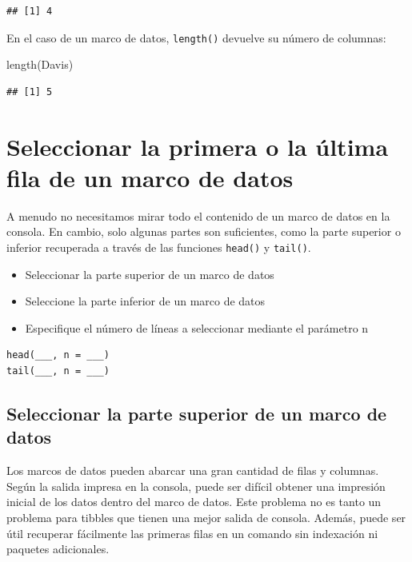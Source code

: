 \documentclass[
]{book}
\newenvironment{Shaded}{\begin{snugshade}}{\end{snugshade}}
\newcommand{\FunctionTok}[1]{\textcolor[rgb]{0.00,0.00,0.00}{#1}}
\newcommand{\NormalTok}[1]{#1}
\providecommand{\tightlist}{%
  \setlength{\itemsep}{0pt}\setlength{\parskip}{0pt}}
\begin{document}
\begin{verbatim}
## [1] 4
\end{verbatim}

En el caso de un marco de datos, \texttt{length()} devuelve su número de columnas:

\begin{Shaded}
\begin{Highlighting}[]
\FunctionTok{length}\NormalTok{(Davis)}
\end{Highlighting}
\end{Shaded}

\begin{verbatim}
## [1] 5
\end{verbatim}

\hypertarget{seleccionar-la-primera-o-la-uxfaltima-fila-de-un-marco-de-datos}{%
\section{Seleccionar la primera o la última fila de un marco de datos}\label{seleccionar-la-primera-o-la-uxfaltima-fila-de-un-marco-de-datos}}

A menudo no necesitamos mirar todo el contenido de un marco de datos en la consola. En cambio, solo algunas partes son suficientes, como la parte superior o inferior recuperada a través de las funciones \texttt{head()} y \texttt{tail()}.

\begin{itemize}
\tightlist
\item
  Seleccionar la parte superior de un marco de datos
\item
  Seleccione la parte inferior de un marco de datos
\item
  Especifique el número de líneas a seleccionar mediante el parámetro n
\end{itemize}

\begin{verbatim}
head(___, n = ___)
tail(___, n = ___)
\end{verbatim}

\hypertarget{seleccionar-la-parte-superior-de-un-marco-de-datos}{%
\subsection{Seleccionar la parte superior de un marco de datos}\label{seleccionar-la-parte-superior-de-un-marco-de-datos}}

Los marcos de datos pueden abarcar una gran cantidad de filas y columnas. Según la salida impresa en la consola, puede ser difícil obtener una impresión inicial de los datos dentro del marco de datos. Este problema no es tanto un problema para tibbles que tienen una mejor salida de consola. Además, puede ser útil recuperar fácilmente las primeras filas en un comando sin indexación ni paquetes adicionales.
\end{document}
